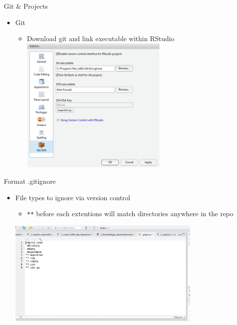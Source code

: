 \documentclass[
  ignorenonframetext,
]{beamer}
\providecommand{\tightlist}{%
  \setlength{\itemsep}{0pt}\setlength{\parskip}{0pt}}
\begin{document}
\begin{frame}{Git \& Projects}
\protect\hypertarget{git-projects}{}

\begin{itemize}
\tightlist
\item
  Git

  \begin{itemize}
  \tightlist
  \item
    Download git and link executable within RStudio
    \includegraphics[width=0.6\textwidth,height=\textheight]{../external/images/setup_1_rstudio_git.PNG}
  \end{itemize}
\end{itemize}

\end{frame}

\begin{frame}[fragile]{Format .gitignore}
\protect\hypertarget{format-.gitignore}{}

\begin{itemize}
\tightlist
\item
  File types to ignore via version control

  \begin{itemize}
  \tightlist
  \item
    \texttt{**} before each extentions will match directories anywhere
    in the repo
  \end{itemize}

  \includegraphics[width=0.75\textwidth,height=\textheight]{../external/images/gitignore.PNG}
\end{itemize}

\end{frame}
\end{document}
